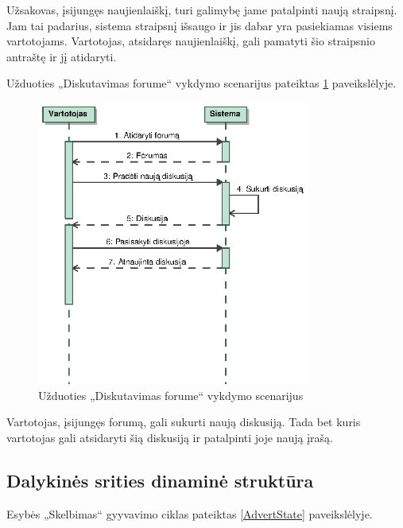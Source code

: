 \documentclass[12pt]{article}
\begin{document}
	Užsakovas, įsijungęs naujienlaiškį, turi galimybę jame patalpinti naują straipsnį. Jam tai padarius, sistema straipsnį išsaugo ir jis dabar yra pasiekiamas visiems vartotojams. Vartotojas, atsidaręs naujienlaiškį, gali pamatyti šio straipsnio antraštę ir jį atidaryti.
	\pagebreak
	
	Užduoties „Diskutavimas forume“ vykdymo scenarijus pateiktas \ref{ForumScenario} paveikslėlyje.
	
	\begin{figure}[h]
		\begin{center}
			\includegraphics[width=0.8\textwidth]{Forumas.eps}
			\caption{Užduoties „Diskutavimas forume“ vykdymo scenarijus\label{ForumScenario}}
		\end{center}
	\end{figure}
	
	Vartotojas, įsijungęs forumą, gali sukurti naują diskusiją. Tada bet kuris vartotojas gali atsidaryti šią diskusiją ir patalpinti joje naują įrašą.
	\pagebreak
	
	\subsection{Dalykinės srities dinaminė struktūra}
	
	Esybės „Skelbimas“ gyyvavimo ciklas pateiktas \ref{AdvertState} paveikslėlyje.
	
\end{document}
